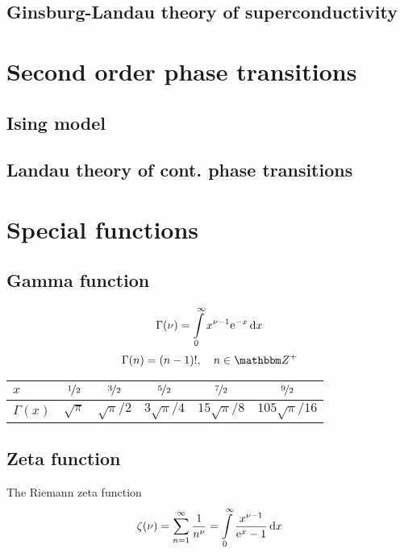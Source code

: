 \documentclass[11pt,letter, swedish, english, twocolumn
]{article}
\begin{document}
\subsection{Ginsburg-Landau theory of superconductivity}




\section{Second order phase transitions}

\subsection{Ising model}

\subsection{Landau theory of cont. phase transitions}


\clearpage
\appendix
\section{Special functions}
\subsection{Gamma function}
\begin{equation}
\Gamma(\nu)=\int_0^\infty x^{\nu-1}\ee^{-x}\id{x}
\end{equation}
\begin{equation}
\Gamma(n)=(n-1)!\qcomma n\in\Z^+
\end{equation}

\begin{center}
\begin{tabular}{|l||c|c|c|c|c|}\hline
$x$ & $\nicefrac{1}{2}$ & $\nicefrac{3}{2}$ & $\nicefrac{5}{2}$
& $\nicefrac{7}{2}$ & $\nicefrac{9}{2}$\\ \hline
$\Gamma(x)$ & $\sqrt{\pi}$ & $\sqrt{\pi}/2$ & $3\sqrt{\pi}/4$
& $15\sqrt{\pi}/8$ & $105\sqrt{\pi}/16$
\\ \hline
\end{tabular}
\end{center}


\subsection{Zeta function}
The Riemann zeta function
\begin{equation}
\zeta(\nu)=\sum_{n=1}^\infty \frac{1}{n^\nu}
=\int_0^\infty \frac{x^{\nu-1}}{\ee^x -1}\id{x}
\end{equation}
\end{document}
